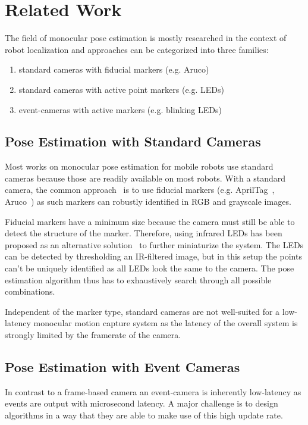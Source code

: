 \section{Related Work}
\label{sec:related_work}
The field of monocular pose estimation is mostly researched in the context of robot localization and approaches can be categorized into three families:
\begin{enumerate}
    \item standard cameras with fiducial markers (e.g. Aruco) 
    \item standard cameras with active point markers (e.g. LEDs) 
    \item event-cameras with active markers (e.g. blinking LEDs) 
\end{enumerate}

\subsection{Pose Estimation with Standard Cameras}
Most works on monocular pose estimation for mobile robots use standard cameras because those are readily available on most robots. With a standard camera, the common approach~\cite{breitenmoser2011monocular, benligiray2019stagstablefiducialmarker, kalaitzakis2021fiducial} is to use fiducial markers (e.g. AprilTag~\cite{olson2011apriltag}, Aruco~\cite{garrido2014aruco}) as such markers can robustly identified in RGB and grayscale images. 

Fiducial markers have a minimum size because the camera must still be able to detect the structure of the marker. Therefore, using infrared LEDs has been proposed as an alternative solution~\cite{faessler14monocular} to further miniaturize the system. The LEDs can be detected by thresholding an IR-filtered image, but in this setup the points can't be uniquely identified as all LEDs look the same to the camera. The pose estimation algorithm thus has to exhaustively search through all possible combinations.

Independent of the marker type, standard cameras are not well-suited for a low-latency monocular motion capture system as the latency of the overall system is strongly limited by the framerate of the camera. 

\subsection{Pose Estimation with Event Cameras}
In contrast to a frame-based camera an event-camera is inherently low-latency as events are output with microsecond latency. A major challenge is to design algorithms in a way that they are able to make use of this high update rate.

